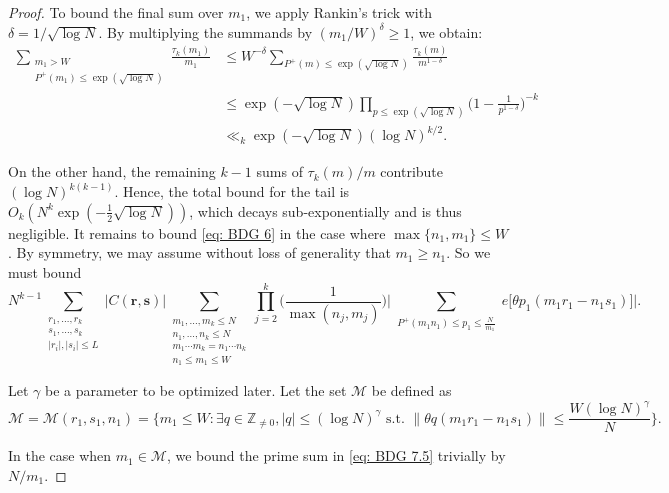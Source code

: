 \documentclass[12pt]{amsart}
\renewcommand{\le}{\leqslant}
\renewcommand{\leq}{\leqslant}
\renewcommand{\ge}{\geqslant}
\numberwithin{equation}{section}
\theoremstyle{plain}
\theoremstyle{definition}
\newcommand{\Z}{\mathbb{Z}}
\newcommand{\CM}{\mathcal{M}}
\begin{document}
\begin{proof}
		To bound the final sum over $m_1$, we apply Rankin's trick with $\delta = 1/\sqrt{\log N}$. By multiplying the summands by $(m_1/W)^\delta \ge 1$, we obtain:
		\begin{align*}
			\sum_{\substack{ m_1 > W \\ P^+(m_1) \leq \exp(\sqrt{\log N})}} \frac{\tau_k(m_1)}{m_1} &\le W^{-\delta} \sum_{P^+(m) \le \exp(\sqrt{\log N})} \frac{\tau_k(m)}{m^{1-\delta}} \\
			&\le \exp(-\sqrt{\log N}) \prod_{p \le \exp(\sqrt{\log N})} \bigg(1 - \frac{1}{p^{1-\delta}}\bigg)^{-k} \\
			&\ll_k \exp(-\sqrt{\log N}) (\log N)^{k/2}.
		\end{align*}
		
		On the other hand, the remaining $k-1$ sums of $\tau_k(m)/m$ contribute $(\log N)^{k(k-1)}$. Hence, the total bound for the tail is $O_k(N^k \exp(-\frac{1}{2}\sqrt{\log N}))$, which decays sub-exponentially and is thus negligible.
		It remains to bound \eqref{eq: BDG 6} in the case where $\max\{n_1,m_1\} \leq W$. By symmetry, we may assume without loss of generality that $m_1 \ge n_1$. So we must bound
		\begin{equation}\label{eq: BDG 7.5}
			N^{k-1}\sum_{\substack{r_1,\dots ,r_k \\ s_1,\dots ,s_k \\ |r_i|,|s_i| \leq L}}|C(\bm{r,s})|\sum_{\substack{m_1,\dots, m_k\leq N\\ n_1,\dots ,n_k \leq N\\ m_1\cdots m_k=n_1 \cdots n_k \\ n_1 \le m_1 \leq W}} \prod_{j = 2}^{k} \bigg(\frac{1}{\max(n_j,m_j)}\bigg) \bigg| \sum_{\substack{ P^+(m_1n_1) \leq p_1 \leq \frac{N}{m_1}}} e\big[\theta p_1(m_1r_1-n_1s_1)\big]\bigg|.
		\end{equation}
		
		Let $\gamma$ be a parameter to be optimized later. Let the set $\CM$ be defined as
		$$\CM =\CM(r_1,s_1,n_1) = \bigg\{m_1 \leq W : \exists q \in \Z_{\ne 0}, |q| \leq (\log N)^{\gamma} \text{ s.t. } \|\theta q (m_1r_1-n_1s_1)\| \leq \frac{W(\log N)^{\gamma}}{N} \bigg\}.$$
		
		In the case when $m_1 \in \CM$, we bound the prime sum in \eqref{eq: BDG 7.5} trivially by $N/m_1$.
		

\end{proof}
\end{document}
